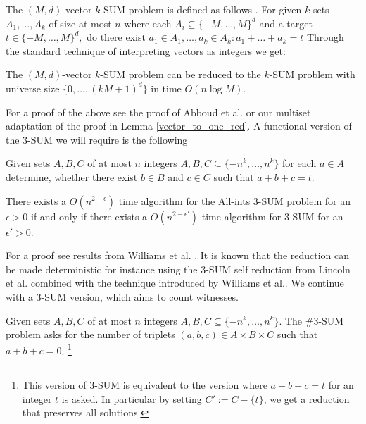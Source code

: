 The $(M,d)$-vector $k$-SUM problem is defined as follows \cite{DBLP:journals/corr/AbboudLW13}.
For given $k$ sets $A_1 ,\dots ,A_k$ of size at most $n$ where each $A_i \subseteq \{-M,\dots, M\}^d$ and a target $t \in \{-M,\dots, M\}^d,$
do there exist $a_1 \in A_1, \dots, a_k \in A_k: a_1+\dots+ a_k=t$ 
Through the standard technique of interpreting vectors as integers we get:
\begin{lemma}
  The $(M,d)$-vector $k$-SUM problem can be reduced to the $k$-SUM problem with universe size $\{0,\dots, (kM+1)^d\}$ in time $O(n \log M).$
\label{trans_vec_to_k}
\end{lemma}
For a proof of the above see the proof of Abboud et al. \cite{DBLP:journals/corr/AbboudLW13} or our multiset adaptation of the proof in Lemma \ref{vector_to_one_red}.
A functional version of the $3$-SUM we will require is the following
\begin{definition}
Given sets $A,B,C$ of at most $n$ integers $A,B,C \subseteq \{-n^k, \dots, n^k\}$ for each $a \in A$ determine,
whether there exist $b \in B$ and $c \in C$ such that $a+b+c=t$.
\end{definition}
\begin{lemma}
There exists a $O(n^{2-\epsilon})$ time algorithm for the All-ints $3$-SUM problem for an $\epsilon>0$
if and only if there exists a $O(n^{2-\epsilon'})$ time algorithm for $3$-SUM for an $\epsilon'>0$.
\label{allintsequiv}
\end{lemma}
For a proof see results from Williams et al. \cite{DBLP:conf/focs/WilliamsW10}.
It is known that the reduction can be made deterministic for instance using the $3$-SUM self reduction from Lincoln et al. \cite{DBLP:conf/icalp/LincolnWWW16} combined with the technique
introduced by Williams et al.\cite{DBLP:conf/focs/WilliamsW10}.
We continue with a $3$-SUM version, which aims to count witnesses.

  \begin{definition}[$\#3$-SUM]
    Given sets $A,B,C$ of at most $n$ integers $A,B,C \subseteq \{-n^k, \dots, n^k\}$.  The $\#3$-SUM problem asks for the number of triplets $(a,b,c) \in A \times B \times C$ such that $a+b+c=0$. \footnote{This version of $3$-SUM is equivalent to the version where $a+b+c=t$  for an integer $t$ is asked. In particular by setting $C':=C-\{t\}$, we get a reduction that preserves all solutions.}
    \end{definition}
  
